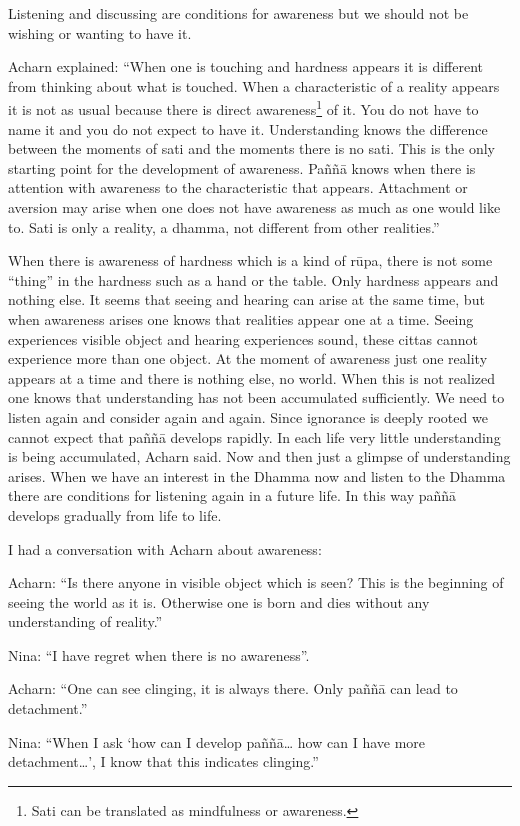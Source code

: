 Listening and discussing are conditions for awareness but we should not
be wishing or wanting to have it.

Acharn explained: ``When one is touching and hardness appears it is
different from thinking about what is touched. When a characteristic of
a reality appears it is not as usual because there is direct
awareness\footnote{Sati can be translated
as mindfulness or awareness.} of it. You do
not have to name it and you do not expect to have it. Understanding
knows the difference between the moments of sati and the moments there
is no sati. This is the only starting point for the development of
awareness. Paññā knows when there is attention with awareness to the
characteristic that appears. Attachment or aversion may arise when one
does not have awareness as much as one would like to. Sati is only a
reality, a dhamma, not different from other realities.''

When there is awareness of hardness which is a kind of rūpa, there is
not some ``thing'' in the hardness such as a hand or the table. Only
hardness appears and nothing else. It seems that seeing and hearing can
arise at the same time, but when awareness arises one knows that
realities appear one at a time. Seeing experiences visible object and
hearing experiences sound, these cittas cannot experience more than one
object. At the moment of awareness just one reality appears at a time
and there is nothing else, no world. When this is not realized one knows
that understanding has not been accumulated sufficiently. We need to
listen again and consider again and again. Since ignorance is deeply
rooted we cannot expect that paññā develops rapidly. In each life very
little understanding is being accumulated, Acharn said. Now and then
just a glimpse of understanding arises. When we have an interest in the
Dhamma now and listen to the Dhamma there are conditions for listening
again in a future life. In this way paññā develops gradually from life
to life.

I had a conversation with Acharn about awareness:

Acharn: ``Is there anyone in visible object which is seen? This is the
beginning of seeing the world as it is. Otherwise one is born and dies
without any understanding of reality.''

Nina: ``I have regret when there is no awareness''.

Acharn: ``One can see clinging, it is always there. Only paññā can lead
to detachment.''

Nina: ``When I ask `how can I develop paññā\ldots{} how can I have more
detachment\ldots{}', I know that this indicates clinging.''

